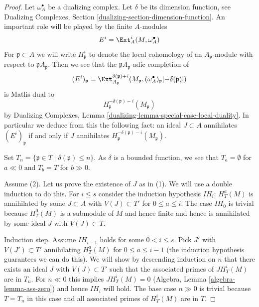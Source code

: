 \begin{proof}
Let $\omega_A^\bullet$ be a dualizing complex. Let $\delta$ be its
dimension function, see Dualizing Complexes, Section
\ref{dualizing-section-dimension-function}.
An important role will be played by the finite $A$-modules
$$
E^i = \Ext_A^i(M, \omega_A^\bullet)
$$
For $\mathfrak p \subset A$ we will write $H^i_\mathfrak p$ to denote the
local cohomology of an $A_\mathfrak p$-module with respect to
$\mathfrak pA_\mathfrak p$. Then we see that
the $\mathfrak pA_\mathfrak p$-adic completion of
$$
(E^i)_\mathfrak p =
\Ext^{\delta(\mathfrak p) + i}_{A_\mathfrak p}(M_\mathfrak p,
(\omega_A^\bullet)_\mathfrak p[-\delta(\mathfrak p)])
$$
is Matlis dual to
$$
H^{-\delta(\mathfrak p) - i}_{\mathfrak p}(M_\mathfrak p)
$$
by
Dualizing Complexes, Lemma \ref{dualizing-lemma-special-case-local-duality}.
In particular we deduce from this the
following fact: an ideal $J \subset A$ annihilates
$(E^i)_\mathfrak p$ if and only if $J$ annihilates
$H^{-\delta(\mathfrak p) - i}_{\mathfrak p}(M_\mathfrak p)$.

\medskip\noindent
Set $T_n = \{\mathfrak p \in T \mid \delta(\mathfrak p) \leq n\}$.
As $\delta$ is a bounded function, we see that
$T_a = \emptyset$ for $a \ll 0$ and $T_b = T$ for $b \gg 0$.

\medskip\noindent
Assume (2). Let us prove the existence of $J$ as in (1).
We will use a double induction to do this. For $i \leq s$
consider the induction hypothesis $IH_i$:
$H^a_T(M)$ is annihilated by some $J \subset A$ with $V(J) \subset T'$
for $0 \leq a \leq i$. The case $IH_0$ is trivial
because $H^0_T(M)$ is a submodule of $M$ and hence finite
and hence is annihilated by some ideal $J$ with $V(J) \subset T$.

\medskip\noindent
Induction step. Assume $IH_{i - 1}$ holds for some $0 < i \leq s$.
Pick $J'$ with $V(J') \subset T'$ annihilating $H^a_T(M)$ for
$0 \leq a \leq i - 1$ (the induction hypothesis guarantees we can
do this). We will show by descending induction on $n$
that there exists an ideal $J$ with $V(J) \subset T'$ such that the
associated primes of $J H^i_T(M)$ are in $T_n$.
For $n \ll 0$ this implies $JH^i_T(M) = 0$
(Algebra, Lemma \ref{algebra-lemma-ass-zero})
and hence $IH_i$ will hold.
The base case $n \gg 0$ is trivial because $T = T_n$ in this case
and all associated primes of $H^i_T(M)$ are in $T$.


\end{proof}
